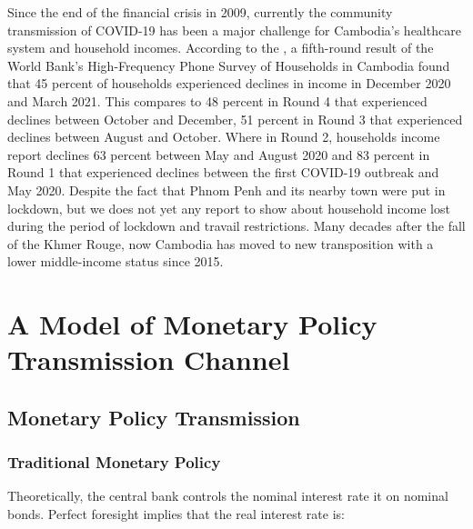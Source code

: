\documentclass[11pt,letterpaper]{article}
\begin{document}
Since the end of the financial crisis in 2009, currently the community transmission of COVID-19 has been a major challenge for Cambodia's healthcare system and household incomes. According to the \cite{Karamba2021}, a fifth-round result of the World Bank's High-Frequency Phone Survey of Households in Cambodia found that 45 percent of households experienced declines in income in December 2020 and March 2021. This compares to 48 percent in Round 4 that experienced declines between October and December, 51 percent in Round 3 that experienced declines between August and October. Where in Round 2, households income report declines 63 percent between May and August 2020 and 83 percent in Round 1 that experienced declines between the first COVID-19 outbreak and May 2020. Despite the fact that Phnom Penh and its nearby town were put in lockdown, but we does not yet any report to show about household income lost during the period of lockdown and travail restrictions.  
Many decades after the fall of the Khmer Rouge, now Cambodia has moved to new transposition with a lower middle-income status since 2015. 
\clearpage
\section{A Model of Monetary Policy Transmission Channel}\label{sec:model}

\subsection{Monetary Policy Transmission}
\subsubsection{Traditional Monetary Policy}
Theoretically, the central bank controls the nominal interest rate it on nominal bonds. Perfect foresight implies that the real interest rate is:
\end{document}
